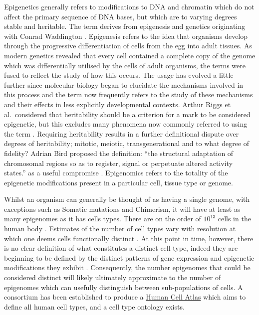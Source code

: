 \documentclass[]{book}
\begin{document}
Epigenetics generally refers to modifications to DNA and chromatin which do not affect the primary sequence of DNA bases, but which are to varying degrees stable and heritable. The term derives from epigenesis and genetics originating with Conrad Waddington \citep{Waddington1942}. Epigenesis refers to the idea that organisms develop through the progressive differentiation of cells from the egg into adult tissues. As modern genetics revealed that every cell contained a complete copy of the genome which was differentially utilised by the cells of adult organisms, the terms were fused to reflect the study of how this occurs. The usage has evolved a little further since molecular biology began to elucidate the mechanisms involved in this process and the term now frequently refers to the study of these mechanisms and their effects in less explicitly developmental contexts. Arthur Riggs et al.~considered that heritability should be a criterion for a mark to be considered epigenetic, but this excludes many phenomena now commonly referred to using the term \citep{Russo1996}. Requiring heritability results in a further definitional dispute over degrees of heritability; mitotic, meiotic, transgenerational and to what degree of fidelity? Adrian Bird proposed the definition: ``the structural adaptation of chromosomal regions so as to register, signal or perpetuate altered activity states.'' as a useful compromise \citep{Bird2007}. Epigenomics refers to the totality of the epigenetic modifications present in a particular cell, tissue type or genome.

Whilst an organism can generally be thought of as having a single genome, with exceptions such as Somatic mutations and Chimerism, it will have at least as many epigenomes as it has cells types. There are on the order of \(10^{13}\) cells in the human body \citep{Bianconi2013}. Estimates of the number of cell types vary with resolution at which one deems cells functionally distinct \citep{HumanCellAtlas}. At this point in time, however, there is no clear definition of what constitutes a distinct cell type, indeed they are beginning to be defined by the distinct patterns of gene expression and epigenetic modifications they exhibit \citep{CellSystemsCellType2017}. Consequently, the number epigenomes that could be considered distinct will likely ultimately approximate to the number of epigenomes which can usefully distinguish between sub-populations of cells. A consortium has been established to produce a \href{www.humancellatlas.org}{Human Cell Atlas} \citep{Regev2017} which aims to define all human cell types, and a cell type ontology \citep{CellOntologyOBO} exists.
\end{document}

